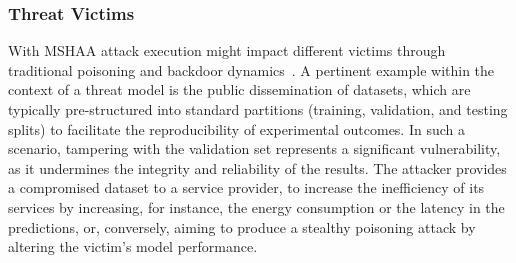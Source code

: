 \subsubsection{Threat Victims}
With MSHAA attack execution might impact different victims through traditional poisoning and backdoor dynamics~\cite{tian2022comprehensive, li2022backdoor}. 
A pertinent example within the context of a threat model is the public dissemination of datasets, which are typically pre-structured into standard partitions (training, validation, and testing splits) to facilitate the reproducibility of experimental outcomes. In such a scenario, tampering with the validation set represents a significant vulnerability, as it undermines the integrity and reliability of the results. 
The attacker provides a compromised dataset to a service provider, to increase the inefficiency of its services by increasing, for instance, the energy consumption or the latency in the predictions, or, conversely, aiming to produce a stealthy poisoning attack by altering the victim's model performance. 


